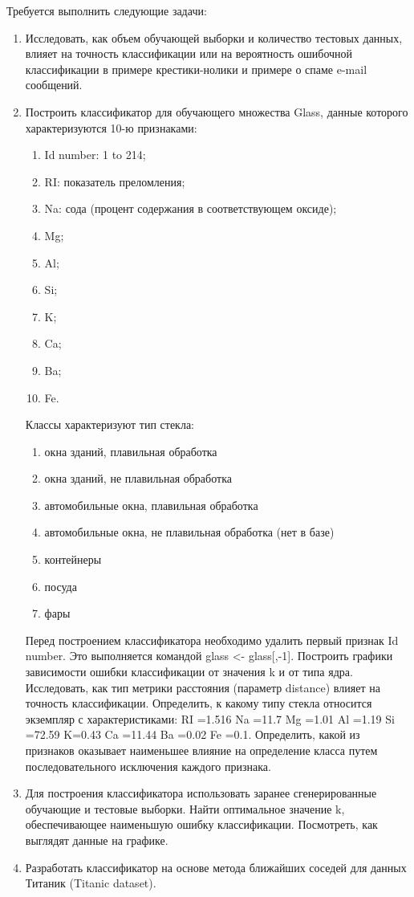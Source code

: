 \documentclass[]{article}
\numberwithin{equation}{section}
\begin{document}
    Требуется выполнить следующие задачи:
    \begin{enumerate}
        \item Исследовать, как объем обучающей выборки и количество тестовых данных, влияет на точность классификации или на вероятность ошибочной классификации в примере крестики-нолики и примере о спаме e-mail сообщений.
        \item Построить классификатор для обучающего множества Glass, данные которого характеризуются 10-ю признаками:
            \begin{enumerate}
                \item Id number: 1 to 214;
                \item RI: показатель преломления;
                \item Na: сода (процент содержания в соответствующем оксиде);
                \item Mg;
                \item Al;
                \item Si;
                \item K;
                \item Ca;
                \item Ba;
                \item Fe.
            \end{enumerate}
            Классы характеризуют тип стекла:
            \begin{enumerate}
                \item окна зданий, плавильная обработка
                \item окна зданий, не плавильная обработка
                \item автомобильные окна, плавильная обработка
                \item автомобильные окна, не плавильная обработка (нет в базе)
                \item контейнеры
                \item посуда
                \item фары
            \end{enumerate}
            Перед построением классификатора необходимо удалить первый признак Id number. Это выполняется командой glass <- glass[,-1]. Построить графики зависимости ошибки классификации от значения k и от типа ядра. Исследовать, как тип метрики расстояния (параметр distance) влияет на точность классификации. Определить, к какому типу стекла относится экземпляр с характеристиками: RI =1.516 Na =11.7 Mg =1.01 Al =1.19 Si =72.59 K=0.43 Ca =11.44 Ba =0.02 Fe =0.1. Определить, какой из признаков оказывает наименьшее влияние на определение класса путем последовательного исключения каждого признака.
        \item Для построения классификатора использовать заранее сгенерированные обучающие и тестовые выборки. Найти оптимальное значение k, обеспечивающее наименьшую ошибку классификации. Посмотреть, как выглядят данные на графике.
        \item Разработать классификатор на основе метода ближайших соседей для данных Титаник (Titanic dataset).
    \end{enumerate}
\end{document}
